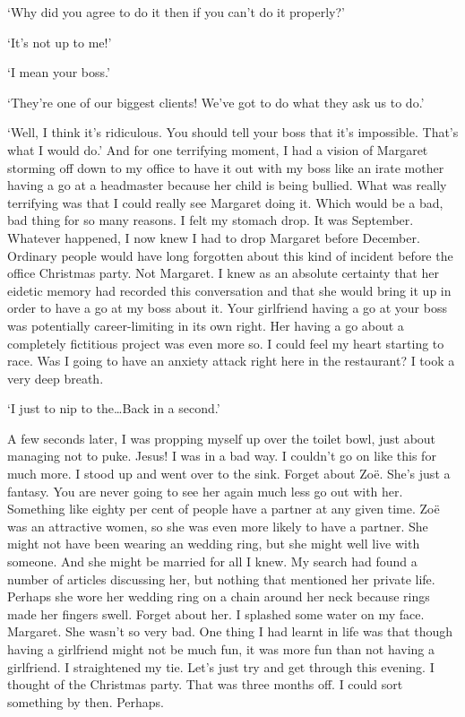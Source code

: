 `Why did you agree to do it then if you can't do it properly?'

`It's not up to me!'

`I mean your boss.'

`They're one of our biggest clients! We've got to do what they ask
us to do.'

`Well, I think it's ridiculous. You should tell your boss that it's
impossible. That's what I would do.' And for one terrifying moment,
I had a vision of Margaret storming off down to my office to have it
out with my boss like an irate mother having a go at a headmaster
because her child is being bullied. What was really terrifying was
that I could really see Margaret doing it. Which would be a bad, bad
thing for so many reasons. I felt my stomach drop. It was September.
Whatever happened, I now knew I had to drop Margaret before
December. Ordinary people would have long forgotten about this kind
of incident before the office Christmas party. Not Margaret. I knew
as an absolute certainty that her eidetic memory had recorded this
conversation and that she would bring it up in order to have a go at
my boss about it. Your girlfriend having a go at your boss was
potentially career-limiting in its own right. Her having a go about
a completely fictitious project was even more so. I could feel my
heart starting to race. Was I going to have an anxiety attack right
here in the restaurant? I took a very deep breath.

`I just to nip to the\dots Back in a second.'

A few seconds later, I was propping myself up over the toilet bowl,
just about managing not to puke. Jesus! I was in a bad way. I
couldn't go on like this for much more. I stood up and went over to
the sink. Forget about Zoë. She's just a fantasy. You are never
going to see her again much less go out with her. Something like
eighty per cent of people have a partner at any given time. Zoë
was an attractive women, so she was even more likely to have a
partner. She might not have been wearing an wedding ring, but she
might well live with someone. And she might be married for all I
knew. My search had found a number of articles discussing
her, but nothing that mentioned her private life. Perhaps she wore
her wedding ring on a chain around her neck because rings made her
fingers swell. Forget about her. I splashed some water on my face.
Margaret. She wasn't so very bad. One thing I had learnt in life was
that though having a girlfriend might not be much fun, it was more
fun than not having a girlfriend. I straightened my tie. Let's just
try and get through this evening. I thought of the Christmas party.
That was three months off. I could sort something by then. Perhaps.

